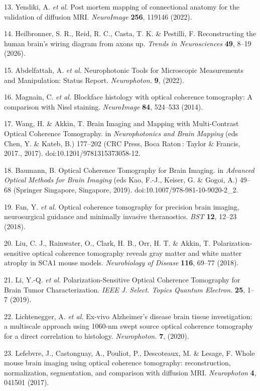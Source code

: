 \documentclass{article}
\begin{document}
\begin{hangpars}
13. Yendiki, A. \emph{et al.} Post mortem mapping of connectional anatomy for the validation of diffusion MRI. \emph{NeuroImage} \textbf{256}, 119146 (2022).

14. Heilbronner, S. R., Reid, R. C., Casta, T. K. \& Pestilli, F. Reconstructing the human brain’s wiring diagram from axons up. \emph{Trends in Neurosciences} \textbf{49}, 8–19 (2026).

15. Abdelfattah, A. \emph{et al.} Neurophotonic Tools for Microscopic Measurements and Manipulation: Status Report. \emph{Neurophoton.} \textbf{9}, (2022).

16. Magnain, C. \emph{et al.} Blockface histology with optical coherence tomography: A comparison with Nissl staining. \emph{NeuroImage} \textbf{84}, 524–533 (2014).

17. Wang, H. \& Akkin, T. Brain Imaging and Mapping with Multi-Contrast Optical Coherence Tomography. in \emph{Neurophotonics and Brain Mapping} (eds Chen, Y. \& Kateb, B.) 177–202 (CRC Press, Boca Raton : Taylor \& Francis, 2017., 2017). doi:10.1201/9781315373058-12.

18. Baumann, B. Optical Coherence Tomography for Brain Imaging. in \emph{Advanced Optical} \emph{Methods for Brain Imaging} (eds Kao, F.-J., Keiser, G. \& Gogoi, A.) 49–68 (Springer Singapore, Singapore, 2019). doi:10.1007/978-981-10-9020-2\_2.

19. Fan, Y. \emph{et al.} Optical coherence tomography for precision brain imaging, neurosurgical guidance and minimally invasive theranostics. \emph{BST} \textbf{12}, 12–23 (2018).

20. Liu, C. J., Rainwater, O., Clark, H. B., Orr, H. T. \& Akkin, T. Polarization-sensitive optical coherence tomography reveals gray matter and white matter atrophy in SCA1 mouse models. \emph{Neurobiology of Disease} \textbf{116}, 69–77 (2018).

21. Li, Y.-Q. \emph{et al.} Polarization-Sensitive Optical Coherence Tomography for Brain Tumor Characterization. \emph{IEEE J. Select. Topics Quantum Electron.} \textbf{25}, 1–7 (2019).

22. Lichtenegger, A. \emph{et al.} Ex-vivo Alzheimer’s disease brain tissue investigation: a multiscale approach using 1060-nm swept source optical coherence tomography for a direct correlation to histology. \emph{Neurophoton.} \textbf{7}, (2020).

23. Lefebvre, J., Castonguay, A., Pouliot, P., Descoteaux, M. \& Lesage, F. Whole mouse brain imaging using optical coherence tomography: reconstruction, normalization, segmentation, and comparison with diffusion MRI. \emph{Neurophoton} \textbf{4}, 041501 (2017).


\end{hangpars}
\end{document}
